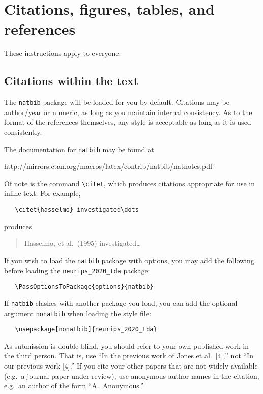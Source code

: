 \documentclass{article}
\begin{document}
\section{Citations, figures, tables, and references}
\label{sec:Others}

These instructions apply to everyone.

\subsection{Citations within the text}

The \verb+natbib+ package will be loaded for you by default.  Citations may be
author/year or numeric, as long as you maintain internal consistency.  As to the
format of the references themselves, any style is acceptable as long as it is
used consistently.

The documentation for \verb+natbib+ may be found at
\begin{center}
  \url{http://mirrors.ctan.org/macros/latex/contrib/natbib/natnotes.pdf}
\end{center}
Of note is the command \verb+\citet+, which produces citations appropriate for
use in inline text.  For example,
\begin{verbatim}
   \citet{hasselmo} investigated\dots
\end{verbatim}
produces
\begin{quote}
  Hasselmo, et al.\ (1995) investigated\dots
\end{quote}
%
If you wish to load the \verb+natbib+ package with options, you may add the
following before loading the \verb+neurips_2020_tda+ package:
\begin{verbatim}
   \PassOptionsToPackage{options}{natbib}
\end{verbatim}

If \verb+natbib+ clashes with another package you load, you can add the optional
argument \verb+nonatbib+ when loading the style file:
\begin{verbatim}
   \usepackage[nonatbib]{neurips_2020_tda}
\end{verbatim}

As submission is double-blind, you should refer to your own published
work in the third person. That is, use ``In the previous work of Jones
et al.\ [4],'' not ``In our previous work [4].'' If you cite your other
papers that are not widely available (e.g.\ a journal paper under
review), use anonymous author names in the citation, e.g.\ an author of
the form ``A.\ Anonymous.''
\end{document}
